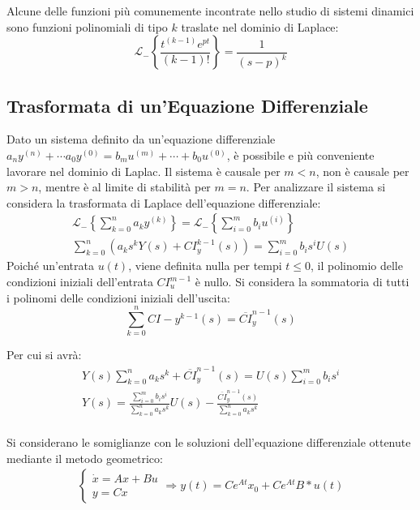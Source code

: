 \documentclass{article}
\numberwithin{equation}{subsection}
\begin{document}
Alcune delle funzioni più comunemente incontrate nello studio di sistemi dinamici sono funzioni polinomiali di tipo $k$ traslate nel dominio di Laplace:
\begin{equation}
    \mathscr{L}_-\left\{\displaystyle\frac{t^{(k-1)}e^{pt}}{(k-1)!}\right\}=\frac{1}{(s-p)^k}
\end{equation}

\subsection{Trasformata di un'Equazione Differenziale}

Dato un sistema definito da un'equazione differenziale $a_ny^{(n)}+\cdots a_0y^{(0)}=b_mu^{(m)}+\cdots+b_0u^{(0)}$, è possibile e più conveniente lavorare nel dominio di 
Laplac. Il sistema è causale per $m<n$, non è causale per $m>n$, mentre è al limite di stabilità per $m=n$. Per analizzare il sistema si considera la trasformata di Laplace 
dell'equazione differenziale:
\begin{gather}
    \mathscr{L}_-\left\{\displaystyle\sum_{k=0}^{n}a_ky^{(k)}\right\}=\mathscr{L}_-\left\{\sum_{i=0}^{m}b_iu^{(i)}\right\}\\
    \displaystyle\sum_{k=0}^{n}\left(a_ks^kY(s)+CI_y^{k-1}(s)\right)=\sum_{i=0}^{m}b_is^iU(s)
\end{gather}
Poiché un'entrata $u(t)$, viene definita nulla per tempi $t\leq0$, il polinomio delle condizioni iniziali dell'entrata $CI_u^{m-1}$ è nullo. Si considera la sommatoria 
di tutti i polinomi delle condizioni iniziali dell'uscita:
\begin{equation}
    \displaystyle\sum_{k=0}^{n}CI-y^{k-1}(s)=\overline{CI}_y^{n-1}(s)
\end{equation}

Per cui si avrà:
\begin{gather}
    Y(s)\displaystyle\sum_{k=0}^{n}a_ks^k+\overline{CI}_y^{n-1}(s)=U(s)\sum_{i=0}^{m}b_is^i\\
    Y(s)=\displaystyle\frac{\sum_{i=0}^{m}b_is^i}{\sum_{k=0}^{n}a_ks^k}U(s)-\frac{\overline{CI}_y^{n-1}(s)}{\sum_{k=0}^{n}a_ks^k}\\
\end{gather}

Si considerano le somiglianze con le soluzioni dell'equazione differenziale ottenute mediante il metodo geometrico:
\begin{gather}
    \begin{cases}
        \dot x=Ax+Bu\\
        y=Cx
    \end{cases}\Rightarrow
    y(t)=Ce^{At}x_0+Ce^{At}B*u(t)
\end{gather}
\end{document}
